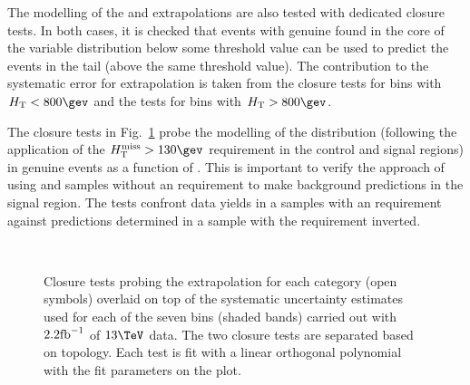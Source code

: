 The modelling of the \alphat and
\bdphi extrapolations are also tested with dedicated closure tests. In both
cases, it is checked that events with genuine \met found in the core
of the variable distribution below some threshold value can be used to
predict the events in the tail (above the same threshold value). The
contribution to the systematic error for \met extrapolation is taken
from the \alphat closure tests for bins with $\scalht<800\gev$ and
the \bdphi tests for bins with $\scalht>800\gev$.

The closure tests in Fig.~\ref{fig:closureAlphaT} probe the modelling
of the \alphat distribution (following the application of the $\mht >
130\gev$ requirement in the control and signal regions) in genuine
\met events as a function of \scalht. This is important to verify the
approach of using \mj and \mmj samples without an \alphat requirement
to make background predictions in the signal region. The tests
confront data yields in a \mj  samples with an \alphat
requirement against predictions determined in a \mj sample with
the \alphat requirement inverted. 

\begin{figure}[h!]
  \begin{center}
    ~~
    \caption{Closure tests probing the \alphat extrapolation for each
      \njet category (open symbols) overlaid on top of the systematic
      uncertainty estimates used for each of the seven \scalht bins
      (shaded bands) carried out with $2.2\ifb$ of $13\tev$
      data. The two closure tests are separated based on topology.
      Each test is fit with a linear orthogonal polynomial with the
      fit parameters on the plot.}
    \label{fig:closureAlphaT}
  \end{center} 
\end{figure}

